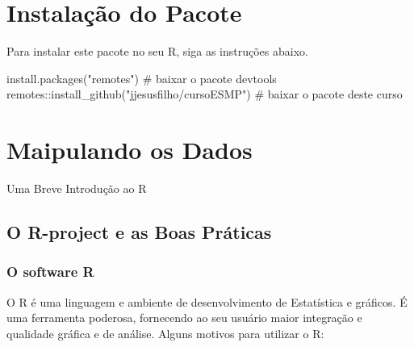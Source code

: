 \documentclass[
  letterpaper,
  DIV=11,
  numbers=noendperiod]{scrreprt}
\newenvironment{Shaded}{\begin{snugshade}}{\end{snugshade}}
\newcommand{\CommentTok}[1]{\textcolor[rgb]{0.37,0.37,0.37}{#1}}
\newcommand{\FunctionTok}[1]{\textcolor[rgb]{0.28,0.35,0.67}{#1}}
\newcommand{\NormalTok}[1]{\textcolor[rgb]{0.00,0.23,0.31}{#1}}
\newcommand{\SpecialCharTok}[1]{\textcolor[rgb]{0.37,0.37,0.37}{#1}}
\newcommand{\StringTok}[1]{\textcolor[rgb]{0.13,0.47,0.30}{#1}}
\begin{document}

\chapter{Instalação do Pacote}\label{instalauxe7uxe3o-do-pacote}

Para instalar este pacote no seu R, siga as instruções abaixo.

\begin{Shaded}
\begin{Highlighting}[]
\FunctionTok{install.packages}\NormalTok{(}\StringTok{"remotes"}\NormalTok{) }\CommentTok{\# baixar o pacote devtools}
\NormalTok{remotes}\SpecialCharTok{::}\FunctionTok{install\_github}\NormalTok{(}\StringTok{"jjesusfilho/cursoESMP"}\NormalTok{) }\CommentTok{\# baixar o pacote deste curso}
\end{Highlighting}
\end{Shaded}


\chapter{Maipulando os Dados}\label{maipulando-os-dados}

Uma Breve Introdução ao R

\hfill\break

\section{O R-project e as Boas
Práticas}\label{o-r-project-e-as-boas-pruxe1ticas}

\subsection{O software R}\label{o-software-r}

O R é uma linguagem e ambiente de desenvolvimento de Estatística e
gráficos. É uma ferramenta poderosa, fornecendo ao seu usuário maior
integração e qualidade gráfica e de análise. Alguns motivos para
utilizar o R:
\end{document}
